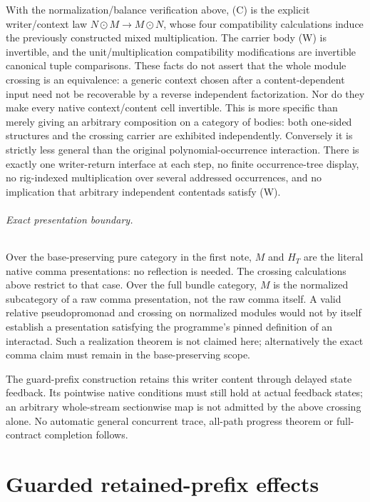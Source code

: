 \documentclass[11pt]{article}
\begin{document}
With the normalization/balance verification above, (C) is the explicit writer/context law $N\odot M\to M\odot N$, whose four compatibility calculations induce the previously constructed mixed multiplication. The carrier body (W) is invertible, and the unit/multiplication compatibility modifications are invertible canonical tuple comparisons. These facts do not assert that the whole module crossing is an equivalence: a generic context chosen after a content-dependent input need not be recoverable by a reverse independent factorization. Nor do they make every native context/content cell invertible. This is more specific than merely giving an arbitrary composition on a category of bodies: both one-sided structures and the crossing carrier are exhibited independently. Conversely it is strictly less general than the original polynomial-occurrence interaction. There is exactly one writer-return interface at each step, no finite occurrence-tree display, no rig-indexed multiplication over several addressed occurrences, and no implication that arbitrary independent contentads satisfy (W).

\paragraph{Exact presentation boundary.} Over the base-preserving pure category in the first note, $M$ and $H_T$ are the literal native comma presentations: no reflection is needed. The crossing calculations above restrict to that case. Over the full bundle category, $M$ is the normalized subcategory of a raw comma presentation, not the raw comma itself. A valid relative pseudopromonad and crossing on normalized modules would not by itself establish a presentation satisfying the programme's pinned definition of an interactad. Such a realization theorem is not claimed here; alternatively the exact comma claim must remain in the base-preserving scope.

The guard-prefix construction retains this writer content through delayed state feedback. Its pointwise native conditions must still hold at actual feedback states; an arbitrary whole-stream sectionwise map is not admitted by the above crossing alone. No automatic general concurrent trace, all-path progress theorem or full-contract completion follows.

\part{Guarded retained-prefix effects}
\end{document}
